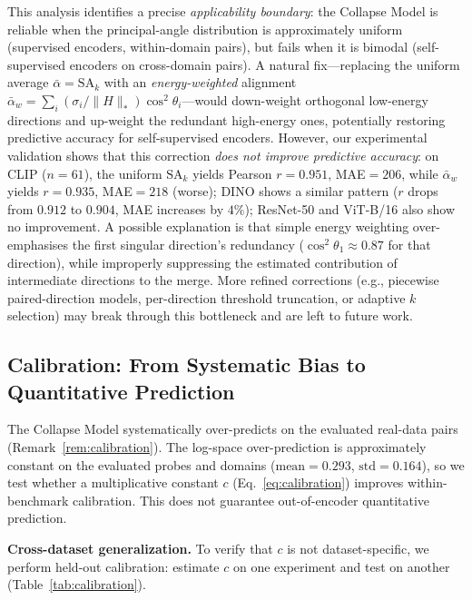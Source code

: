 \documentclass{article}
\newcommand{\SAk}{\ensuremath{\mathrm{SA}_k}\xspace}
\begin{document}
This analysis identifies a precise \emph{applicability boundary}:
the Collapse Model is reliable when the principal-angle distribution
is approximately uniform (supervised encoders, within-domain pairs),
but fails when it is bimodal (self-supervised encoders on cross-domain pairs).
A natural fix---replacing the uniform average $\bar\alpha=\SAk$ with
an \emph{energy-weighted} alignment
$\bar\alpha_w=\sum_i({\sigma_i}/{\|H\|_*})\cos^2\theta_i$---would
down-weight orthogonal low-energy directions and up-weight
the redundant high-energy ones, potentially restoring predictive
accuracy for self-supervised encoders.
However, our experimental validation shows that this correction
\emph{does not improve predictive accuracy}:
on CLIP ($n{=}61$), the uniform $\SAk$ yields Pearson $r{=}0.951$,
MAE${=}206$, while $\bar\alpha_w$ yields $r{=}0.935$, MAE${=}218$ (worse);
DINO shows a similar pattern ($r$ drops from $0.912$ to $0.904$,
MAE increases by $4\%$);
ResNet-50 and ViT-B/16 also show no improvement.
A possible explanation is that simple energy weighting over-emphasises
the first singular direction's redundancy
($\cos^2\theta_1{\approx}0.87$ for that direction),
while improperly suppressing the estimated contribution of
intermediate directions to the merge.
More refined corrections (e.g., piecewise paired-direction models,
per-direction threshold truncation, or adaptive $k$ selection)
may break through this bottleneck and are left to future work.

\subsection{Calibration: From Systematic Bias to Quantitative Prediction}
\label{sec:calibration}

The Collapse Model systematically over-predicts on the evaluated real-data
pairs (Remark~\ref{rem:calibration}).
The log-space over-prediction is approximately constant on the evaluated
probes and domains ($\mathrm{mean}{=}0.293$, $\mathrm{std}{=}0.164$), so we
test whether a multiplicative constant $c$ (Eq.~\ref{eq:calibration}) improves
within-benchmark calibration.  This does not guarantee out-of-encoder
quantitative prediction.

\textbf{Cross-dataset generalization.}
To verify that $c$ is not dataset-specific,
we perform held-out calibration: estimate $c$ on one experiment
and test on another (Table~\ref{tab:calibration}).
\end{document}
